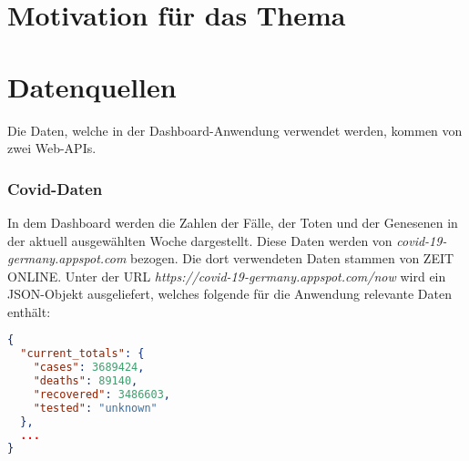 \documentclass[12pt]{article}
\begin{document}
\renewcommand{\mytitle}{Movie Ratings}%
\renewcommand{\myauthor}{Julia Groeniger, Vanessa Kriebel, Paul Schäfer,\\Timo Stovermann, Bastian Wynk}%
\renewcommand{\headheight}{27pt}%


\renewcommand{\plaintitle}{Inhaltsverzeichnis}%
{\def\makebox[#1][#2]#3{#3}%
	\tableofcontents
}


\clearpage
\mainmatter%

\part{Motivation für das Thema}

\part{Datenquellen}
Die Daten, welche in der Dashboard-Anwendung verwendet werden, kommen von zwei Web-APIs.
\section{Covid-Daten}
In dem Dashboard werden die Zahlen der Fälle, der Toten und der Genesenen in der aktuell ausgewählten Woche dargestellt. Diese Daten werden von \textit{covid-19-germany.appspot.com} bezogen. Die dort verwendeten Daten stammen von ZEIT ONLINE. Unter der URL \textit{https://covid-19-germany.appspot.com/now} wird ein JSON-Objekt ausgeliefert, welches folgende für die Anwendung relevante Daten enthält:
\begin{lstlisting}[language=json,firstnumber=1]
{
  "current_totals": {
    "cases": 3689424,
    "deaths": 89140,
    "recovered": 3486603,
    "tested": "unknown"
  },
  ...
}
\end{lstlisting}
\end{document}
